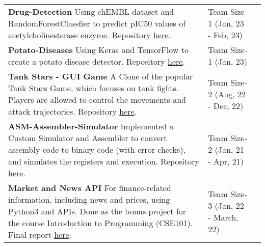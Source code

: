 \documentclass[10pt]{extarticle}
\begin{document}
\vspace{0pt}
\begin{contained}
\begin{longtable}{p{}p{}p{}}
    \textbf{Drug-Detection}\newline
    Using chEMBL dataset and RandomForestClassfier to predict pIC50 values of acetylcholinesterase enzyme.
    Repository \href{https://github.com/guptasameer112/Drug-Detection}{here}.
    &Team Size-1
    \newline (Jan, 23 - Feb, 23)\\
    \textbf{Potato-Diseases}\newline
    Using Keras and TensorFlow to create a potato disease detector. Repository \href{https://github.com/guptasameer112/Potato-Diseases}{here}.
    &Team Size-1
    \newline (Jan, 23)\\
    \textbf{Tank Stars - GUI Game}\newline
    A Clone of the popular Tank Stars Game, which focuses on tank fights. 
    Players are allowed to control the movements and attack trajectories.
    Repository \href{https://github.com/guptasameer112/Tank-Stars}{here}.
    &Team Size-2
    \newline (Aug, 22 - Dec, 22)\\
    \textbf{ASM-Assembler-Simulator}\newline
    Implemented a Custom Simulator and Assembler to convert assembly code to binary code (with error checks), and simulates the registers and execution.
 Repository \href{https://github.com/guptasameer112/Assembler-Simulator}{here}.
    &Team Size-2
    \newline (Jan, 21 - Apr, 21)\\
    \textbf{Market and News API}\newline
    For finance-related information, including news and prices, using Python3 and APIs. Done as the bonus project for the course Introduction to Programming (CSE101).
 Final report \href{https://github.com/guptasameer112/Market-and-News-API}{here}.
    &Team Size-3
    \newline (Jan, 22 - March, 22)\\
\end{longtable}
\end{contained}
\end{document}
